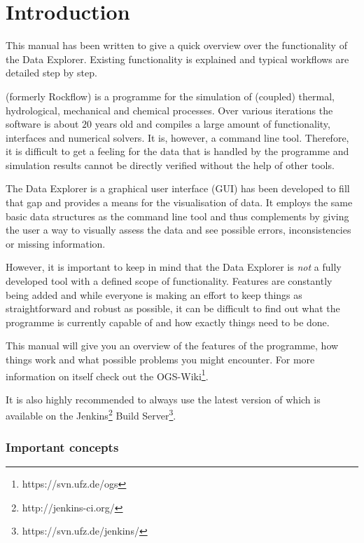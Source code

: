 \chapter{Introduction}

This manual has been written to give a quick overview over the functionality of the \ogs Data Explorer. Existing functionality is explained and typical workflows are detailed step by step.

\bigskip

\ogs (formerly Rockflow) is a programme for the simulation of (coupled) thermal, hydrological, mechanical and chemical processes. Over various iterations the software is about $20$ years old and compiles a large amount of functionality, interfaces and numerical solvers. It is, however, a command line tool. Therefore, it is difficult to get a feeling for the data that is handled by the programme and simulation results cannot be directly verified without the help of other tools.

The \ogs Data Explorer is a graphical user interface (GUI) has been developed to fill that gap and provides a means for the visualisation of data. It employs the same basic data structures as the command line tool and thus complements \ogs by giving the user a way to visually assess the data and see possible errors, inconsistencies or missing information.

However, it is important to keep in mind that the \ogs Data Explorer is \emph{not} a fully developed tool with a defined scope of functionality. Features are constantly being added and while everyone is making an effort to keep things as straightforward and robust as possible, it can be difficult to find out what the programme is currently capable of and how exactly things need to be done.

This manual will give you an overview of the features of the programme, how things work and what possible problems you might encounter. For more information on \ogs itself check out the OGS-Wiki\footnote{https://svn.ufz.de/ogs}.

It is also highly recommended to always use the latest version of \ogs which is available on the Jenkins\footnote{http://jenkins-ci.org/} Build Server\footnote{https://svn.ufz.de/jenkins/}.

\subsection*{Important concepts}

